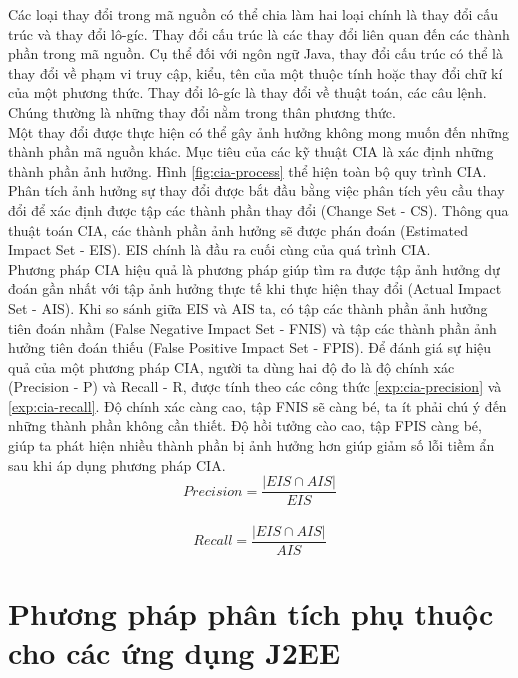 \documentclass[12pt,a4paper]{report}
\begin{document}
Các loại thay đổi trong mã nguồn có thể chia làm hai loại chính là thay đổi cấu trúc và thay đổi lô-gíc. Thay đổi cấu trúc là các thay đổi liên quan đến các thành phần trong mã nguồn. Cụ thể đối với ngôn ngữ Java, thay đổi cấu trúc có thể là thay đổi về phạm vi truy cập, kiểu, tên của một thuộc tính hoặc thay đổi chữ kí của một phương thức. Thay đổi lô-gíc là thay đổi về thuật toán, các câu lệnh. Chúng thường là những thay đổi nằm trong thân phương thức.\\

Một thay đổi được thực hiện có thể gây ảnh hưởng không mong muốn đến những thành phần mã nguồn khác. Mục tiêu của các kỹ thuật CIA là xác định những thành phần ảnh hưởng. Hình \ref{fig:cia-process} thể hiện toàn bộ quy trình CIA. Phân tích ảnh hưởng sự thay đổi được bắt đầu bằng việc phân tích yêu cầu thay đổi để xác định được tập các thành phần thay đổi (Change Set - CS). Thông qua thuật toán CIA, các thành phần ảnh hưởng sẽ được phán đoán (Estimated Impact Set - EIS). EIS chính là đầu ra cuối cùng của quá trình CIA.\\

Phương pháp CIA hiệu quả là phương pháp giúp tìm ra được tập ảnh hưởng dự đoán gần nhất với tập ảnh hưởng thực tế khi thực hiện thay đổi (Actual Impact Set - AIS). Khi so sánh giữa EIS và AIS ta, có tập các thành phần ảnh hưởng tiên đoán nhầm (False Negative Impact Set - FNIS) và tập các thành phần ảnh hưởng tiên đoán thiếu (False Positive Impact Set - FPIS). Để đánh giá sự hiệu quả của một phương pháp CIA, người ta dùng hai độ đo là độ chính xác (Precision - P) và Recall - R, được tính theo các công thức \ref{exp:cia-precision} và \ref{exp:cia-recall}. Độ chính xác càng cao, tập FNIS sẽ càng bé, ta ít phải chú ý đến những thành phần không cần thiết. Độ hồi tưởng cào cao, tập FPIS càng bé, giúp ta phát hiện nhiều thành phần bị ảnh hưởng hơn giúp giảm số lỗi tiềm ẩn sau khi áp dụng phương pháp CIA.\\

\begin{equation}
	Precision = \frac{|EIS \cap AIS|}{EIS}
	\label{exp:cia-precision}
\end{equation}
\\
\begin{equation}
	Recall = \frac{|EIS \cap AIS|}{AIS}
	\label{exp:cia-recall}
\end{equation}

\newpage
\chapter{Phương pháp phân tích phụ thuộc cho các ứng dụng J2EE}
\end{document}

